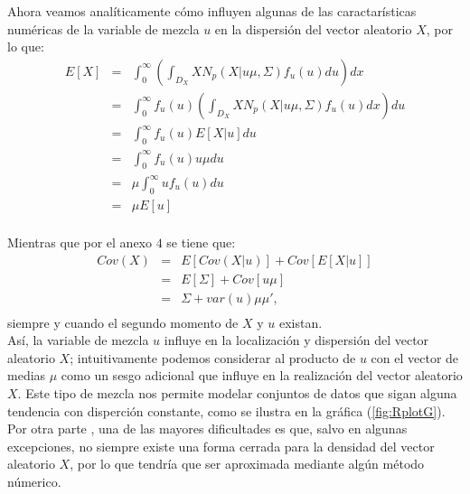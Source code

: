 Ahora veamos analíticamente cómo influyen algunas de las caractarísticas numéricas de la variable de mezcla $u$ en la dispersión del vector aleatorio $X$, por lo que:
\begin{eqnarray}
E[X]& =&\int_{0}^{\infty} \left( \int_{D_{X}}XN_{p}(X|u\mu,\Sigma)f_{u}(u)du\right)  dx \nonumber\\
&=&\int_{0}^{\infty}f_{u}(u)\left(\int_{D_{X}}XN_{p}(X|u\mu,\Sigma)f_{u}(u)dx\right)du\nonumber\\
&=&\int_{0}^{\infty}f_{u}(u)E[X|u]du\nonumber\\
&=&\int_{0}^{\infty}f_{u}(u)u\mu du\nonumber\\
&=&\mu\int_{0}^{\infty}uf_{u}(u)du\nonumber\\
&=&\mu E[u]\nonumber\\
\end{eqnarray}



Mientras que por el anexo $4$ se tiene que: 
\begin{eqnarray}
Cov(X)&=&E[Cov(X|u)]+Cov[E[X|u]]
\nonumber\\
&=&E[\Sigma]+Cov[u\mu]\nonumber\\
&=&\Sigma + var(u)\mu \mu',\nonumber\\
\end{eqnarray}
siempre y cuando el segundo momento de $X$ y $u$ existan. \\

Así, la variable de mezcla $u$ influye en la localización y dispersión del vector aleatorio $X$; intuitivamente podemos considerar al producto de $u$ con el vector de medias $\mu$ como un sesgo adicional que influye en la realización del vector aleatorio $X$. Este tipo de mezcla nos permite modelar conjuntos de datos que sigan alguna tendencia con disperción constante, como se ilustra en la gráfica (\ref{fig:RplotG}). Por otra parte , una de las mayores dificultades es que, salvo en algunas excepciones, no siempre existe una forma cerrada para la densidad del vector aleatorio $X$, por lo que tendría que ser aproximada mediante algún método númerico.\\

